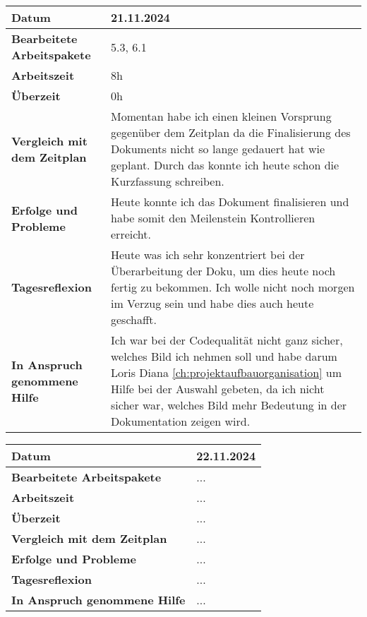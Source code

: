 \begin{longtable}{p{}|p{}}
	\hline
	\textbf{Datum}                       & 21.11.2024            \\
	\hline
	\textbf{Bearbeitete Arbeitspakete}   & 5.3, 6.1                  \\
	\hline
	\textbf{Arbeitszeit}                 & 8h                                    \\
	\hline
	\textbf{Überzeit}                    & 0h                                    \\
	\hline
	\textbf{Vergleich mit dem Zeitplan}  & Momentan habe ich einen kleinen Vorsprung gegenüber dem Zeitplan da die Finalisierung des Dokuments nicht so lange gedauert hat wie geplant. Durch das konnte ich heute schon die Kurzfassung schreiben. \\
	\hline
	\textbf{Erfolge und Probleme} & Heute konnte ich das Dokument finalisieren und habe somit den Meilenstein Kontrollieren erreicht.
	\\
	\hline
	\textbf{Tagesreflexion} & Heute was ich sehr konzentriert bei der Überarbeitung der Doku, um dies heute noch fertig zu bekommen. Ich wolle nicht noch morgen im Verzug sein und habe dies auch heute geschafft.
	\\
	\hline
	\textbf{In Anspruch genommene Hilfe} & Ich war bei der Codequalität nicht ganz sicher, welches Bild ich nehmen soll und habe darum Loris Diana \ref{ch:projektaufbauorganisation} um Hilfe bei der Auswahl gebeten, da ich nicht sicher war, welches Bild mehr Bedeutung in der Dokumentation zeigen wird.                           \\
	\hline
\end{longtable}\label{tab:arbeitsprotokoll-21.11.2024}
\newpage

\begin{longtable}{p{}|p{}}
	\hline
	\textbf{Datum}                       & 22.11.2024            \\
	\hline
	\textbf{Bearbeitete Arbeitspakete}   & ...                  \\
	\hline
	\textbf{Arbeitszeit}                 & ...                                    \\
	\hline
	\textbf{Überzeit}                    & ...                                    \\
	\hline
	\textbf{Vergleich mit dem Zeitplan}  & ... \\
	\hline
	\textbf{Erfolge und Probleme} & ...
	\\
	\hline
	\textbf{Tagesreflexion} & ...
	\\
	\hline
	\textbf{In Anspruch genommene Hilfe} & ...                              \\
	\hline
\end{longtable}\label{tab:arbeitsprotokoll-22.11.2024}
\newpage
